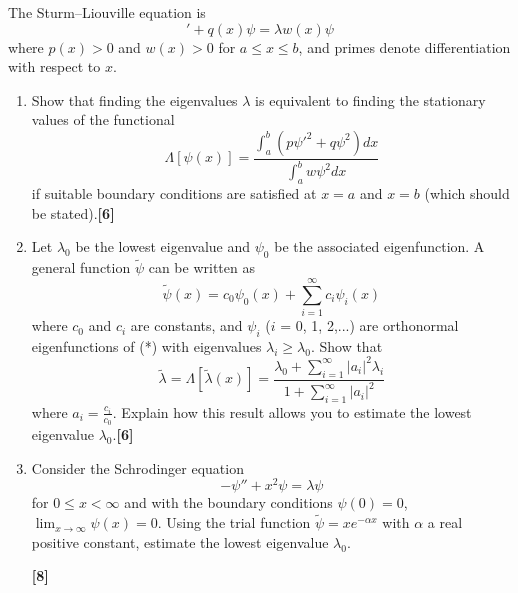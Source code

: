 \documentclass[a4paper]{article}
\begin{document}
\newpage
\begin{qns}
The Sturm–Liouville equation is
\begin{equation}
    [-p(x)\psi']'+q(x)\psi=\lambda w(x)\psi\tag{*}
\end{equation}
where $p(x) > 0$ and $w(x) > 0$ for $a\leq x\leq b$, and primes denote differentiation with respect to $x$.
\begin{enumerate}[label=(\roman*)]
\item Show that finding the eigenvalues $\lambda$ is equivalent to finding the stationary values of the functional
$$\Lambda[\psi(x)]=\frac{\int_a^b(p\psi'^2+q\psi^2)dx}{\int_a^b w\psi^2dx}$$
if suitable boundary conditions are satisfied at $x= a$ and $x = b$ (which should be stated).\hfill \textbf{[6]}
\item Let $\lambda_0$ be the lowest eigenvalue and  $\psi_0$ be the associated eigenfunction. A general function $\tilde{\psi}$ can be written as
$$\tilde{\psi}(x)=c_0\psi_0(x)+\sum_{i=1}^\infty c_i\psi_i(x)$$
where $c_0$ and $c_i$ are constants, and  $\psi_i$ ($i$ = 0, 1, 2,...) are orthonormal eigenfunctions of (*) with eigenvalues $\lambda_i\geq\lambda_0$. Show that
$$\tilde{\lambda}=\Lambda[\tilde{\lambda}(x)]=\frac{\lambda_0+\sum_{i=1}^\infty|a_i|^2\lambda_i}{1+\sum_{i=1}^\infty|a_i|^2}$$
where $a_i=\frac{c_i}{c_0}$. Explain how this result allows you to estimate the lowest eigenvalue $\lambda_0$.\hfill \textbf{[6]}
\item Consider the Schrodinger equation
$$-\psi''+x^2\psi=\lambda\psi$$
for $0\leq x<\infty$ and with the boundary conditions $\psi(0) = 0$, $\lim_{x\rightarrow\infty}\psi(x)=0$. Using the trial function $\tilde{\psi}=xe^{-\alpha x}$ with $\alpha$ a real positive constant, estimate the lowest eigenvalue $\lambda_0$.

\hfill \textbf{[8]}
\end{enumerate}
\end{qns}
\newpage
\end{document}
